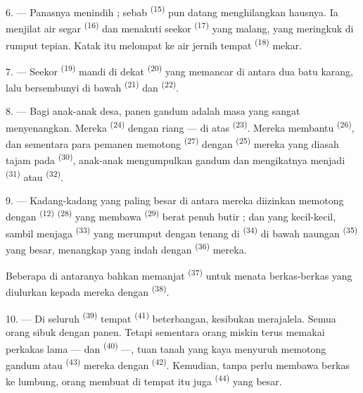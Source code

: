6. --- Panasnya menindih ; sebab  \textsuperscript{(15)}
pun datang menghilangkan hausnya. Ia menjilat air segar  \textsuperscript{(16)} dan menakuti seekor 
\textsuperscript{(17)} yang malang, yang meringkuk di rumput tepian.
Katak itu melompat ke air jernih tempat 
\textsuperscript{(18)} mekar.

7. --- Seekor  \textsuperscript{(19)} mandi di
dekat  \textsuperscript{(20)} yang memancar di
antara dua batu karang, lalu bersembunyi di bawah  \textsuperscript{(21)} dan 
\textsuperscript{(22)}.

\VUsaut{5.0mm}
\VUsaut{3.4mm}

8. --- Bagi anak-anak desa, panen gandum adalah masa yang sangat
menyenangkan. Mereka  \textsuperscript{(24)}
dengan riang — di atas  \textsuperscript{(23)}.
Mereka membantu  \textsuperscript{(26)}, dan
sementara para pemanen memotong 
\textsuperscript{(27)} dengan 
\textsuperscript{(25)} mereka yang diasah tajam pada 
\textsuperscript{(30)}, anak-anak mengumpulkan gandum dan mengikatnya
menjadi  \textsuperscript{(31)} atau  \textsuperscript{(32)}.

9. --- Kadang-kadang yang paling besar di antara mereka diizinkan
memotong dengan  \textsuperscript{(12)}
 \textsuperscript{(28)} yang membawa
\textsuperscript{(29)} berat penuh butir ; dan yang kecil-kecil, sambil
menjaga  \textsuperscript{(33)} yang merumput dengan
tenang di  \textsuperscript{(34)} di bawah
naungan  \textsuperscript{(35)} yang besar,
menangkap  yang indah dengan 
\textsuperscript{(36)} mereka.

Beberapa di antaranya bahkan memanjat 
\textsuperscript{(37)} untuk menata berkas-berkas yang diulurkan kepada
mereka dengan  \textsuperscript{(38)}.

10. --- Di seluruh  \textsuperscript{(39)} tempat
 \textsuperscript{(41)} beterbangan,
kesibukan merajalela. Semua orang sibuk dengan panen. Tetapi sementara
orang miskin terus memakai perkakas lama — 
dan  \textsuperscript{(40)} —, tuan tanah yang
kaya menyuruh memotong gandum atau 
\textsuperscript{(43)} mereka dengan 
\textsuperscript{(42)}. Kemudian, tanpa perlu membawa berkas ke lumbung,
orang membuat di tempat itu juga 
\textsuperscript{(44)} yang besar.

